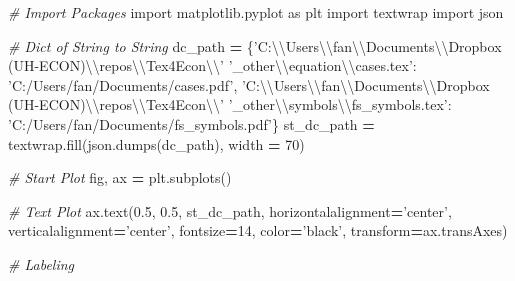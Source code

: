 \documentclass[
]{book}
\newenvironment{Shaded}{\begin{snugshade}}{\end{snugshade}}
\newcommand{\CharTok}[1]{\textcolor[rgb]{0.31,0.60,0.02}{#1}}
\newcommand{\CommentTok}[1]{\textcolor[rgb]{0.56,0.35,0.01}{\textit{#1}}}
\newcommand{\DecValTok}[1]{\textcolor[rgb]{0.00,0.00,0.81}{#1}}
\newcommand{\FloatTok}[1]{\textcolor[rgb]{0.00,0.00,0.81}{#1}}
\newcommand{\ImportTok}[1]{#1}
\newcommand{\NormalTok}[1]{#1}
\newcommand{\OperatorTok}[1]{\textcolor[rgb]{0.81,0.36,0.00}{\textbf{#1}}}
\newcommand{\StringTok}[1]{\textcolor[rgb]{0.31,0.60,0.02}{#1}}
\begin{document}
\begin{Shaded}
\begin{Highlighting}[]
\CommentTok{# Import Packages}
\ImportTok{import}\NormalTok{ matplotlib.pyplot }\ImportTok{as}\NormalTok{ plt}
\ImportTok{import}\NormalTok{ textwrap}
\ImportTok{import}\NormalTok{ json}

\CommentTok{# Dict of String to String}
\NormalTok{dc_path }\OperatorTok{=}\NormalTok{ \{}\StringTok{'C:}\CharTok{\textbackslash{}\textbackslash{}}\StringTok{Users}\CharTok{\textbackslash{}\textbackslash{}}\StringTok{fan}\CharTok{\textbackslash{}\textbackslash{}}\StringTok{Documents}\CharTok{\textbackslash{}\textbackslash{}}\StringTok{Dropbox (UH-ECON)}\CharTok{\textbackslash{}\textbackslash{}}\StringTok{repos}\CharTok{\textbackslash{}\textbackslash{}}\StringTok{Tex4Econ}\CharTok{\textbackslash{}\textbackslash{}}\StringTok{'}
           \StringTok{'_other}\CharTok{\textbackslash{}\textbackslash{}}\StringTok{equation}\CharTok{\textbackslash{}\textbackslash{}}\StringTok{cases.tex'}\NormalTok{:}
               \StringTok{'C:/Users/fan/Documents/cases.pdf'}\NormalTok{,}
           \StringTok{'C:}\CharTok{\textbackslash{}\textbackslash{}}\StringTok{Users}\CharTok{\textbackslash{}\textbackslash{}}\StringTok{fan}\CharTok{\textbackslash{}\textbackslash{}}\StringTok{Documents}\CharTok{\textbackslash{}\textbackslash{}}\StringTok{Dropbox (UH-ECON)}\CharTok{\textbackslash{}\textbackslash{}}\StringTok{repos}\CharTok{\textbackslash{}\textbackslash{}}\StringTok{Tex4Econ}\CharTok{\textbackslash{}\textbackslash{}}\StringTok{'}
           \StringTok{'_other}\CharTok{\textbackslash{}\textbackslash{}}\StringTok{symbols}\CharTok{\textbackslash{}\textbackslash{}}\StringTok{fs_symbols.tex'}\NormalTok{:}
               \StringTok{'C:/Users/fan/Documents/fs_symbols.pdf'}\NormalTok{\}}
\NormalTok{st_dc_path }\OperatorTok{=}\NormalTok{ textwrap.fill(json.dumps(dc_path), width }\OperatorTok{=} \DecValTok{70}\NormalTok{)}

\CommentTok{# Start Plot}
\NormalTok{fig, ax }\OperatorTok{=}\NormalTok{ plt.subplots()}

\CommentTok{# Text Plot}
\NormalTok{ax.text(}\FloatTok{0.5}\NormalTok{, }\FloatTok{0.5}\NormalTok{, st_dc_path,}
\NormalTok{        horizontalalignment}\OperatorTok{=}\StringTok{'center'}\NormalTok{,}
\NormalTok{        verticalalignment}\OperatorTok{=}\StringTok{'center'}\NormalTok{,}
\NormalTok{        fontsize}\OperatorTok{=}\DecValTok{14}\NormalTok{, color}\OperatorTok{=}\StringTok{'black'}\NormalTok{,}
\NormalTok{        transform}\OperatorTok{=}\NormalTok{ax.transAxes)}

\CommentTok{# Labeling}
\end{Highlighting}
\end{Shaded}
\end{document}
